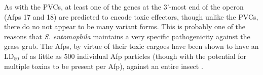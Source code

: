 As with the PVCs, at least one of the genes at the 3'-most end of the operon (Afps 17 and 18) are predicted to encode toxic effectors, though unlike the PVCs, there do no not appear to be many variant forms. This is probably one of the reasons that \emph{S. entomophila} maintains a very specific pathogenicity against the grass grub. The Afps, by virtue of their toxic cargoes have been shown to have an LD$_{50}$ of as little as 500 individual Afp particles (though with the potential for multiple toxins to be present per Afp), against an entire insect \citep{Rybakova1994}.
{
\begin{figure}[p]
\centering
\tabskip=0pt
\end{figure}}

